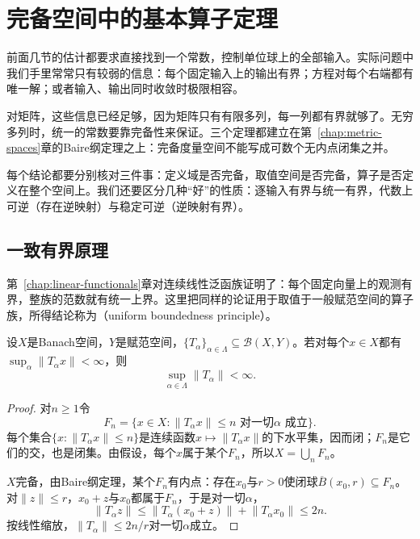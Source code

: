 \section{完备空间中的基本算子定理}
\label{sec:lop-fundamental-theorems}

前面几节的估计都要求直接找到一个常数，控制单位球上的全部输入。实际问题中我们手里常常只有较弱的信息：每个固定输入上的输出有界；方程对每个右端都有唯一解；或者输入、输出同时收敛时极限相容。

对矩阵，这些信息已经足够，因为矩阵只有有限多列，每一列都有界就够了。无穷多列时，统一的常数要靠完备性来保证。三个定理都建立在第~\ref{chap:metric-spaces}章的Baire纲定理之上：完备度量空间不能写成可数个无内点闭集之并。

每个结论都要分别核对三件事：定义域是否完备，取值空间是否完备，算子是否定义在整个空间上。我们还要区分几种“好”的性质：逐输入有界与统一有界，代数上可逆（存在逆映射）与稳定可逆（逆映射有界）。

\subsection{一致有界原理}
\label{sec:lop-uniform-boundedness}

第~\ref{chap:linear-functionals}章对连续线性泛函族证明了：每个固定向量上的观测有界，整族的范数就有统一上界。这里把同样的论证用于取值于一般赋范空间的算子族，所得结论称为（uniform boundedness principle）。

\begin{theorem}[一致有界原理]
\label{thm:lop-uniform-boundedness}
设$X$是Banach空间，$Y$是赋范空间，$\{T_\alpha\}_{\alpha\in\Lambda}\subseteq\mathcal B(X,Y)$。若对每个$x\in X$都有$\sup_\alpha\lVert T_\alpha x\rVert<\infty$，则
\begin{equation}
 \sup_{\alpha\in\Lambda}\lVert T_\alpha\rVert<\infty.
 \label{eq:lop-uniform-boundedness}
\end{equation}
\end{theorem}

\begin{proof}
对$n\geq1$令
\[
 F_n=\{x\in X:\lVert T_\alpha x\rVert\leq n\text{ 对一切}\alpha\text{ 成立}\}.
\]
每个集合$\{x:\lVert T_\alpha x\rVert\leq n\}$是连续函数$x\mapsto\lVert T_\alpha x\rVert$的下水平集，因而闭；$F_n$是它们的交，也是闭集。由假设，每个$x$属于某个$F_n$，所以$X=\bigcup_nF_n$。

$X$完备，由Baire纲定理，某个$F_n$有内点：存在$x_0$与$r>0$使闭球$\overline B(x_0,r)\subseteq F_n$。对$\lVert z\rVert\leq r$，$x_0+z$与$x_0$都属于$F_n$，于是对一切$\alpha$，
\[
 \lVert T_\alpha z\rVert\leq\lVert T_\alpha(x_0+z)\rVert+\lVert T_\alpha x_0\rVert\leq2n .
\]
按线性缩放，$\lVert T_\alpha\rVert\leq2n/r$对一切$\alpha$成立。
\end{proof}

